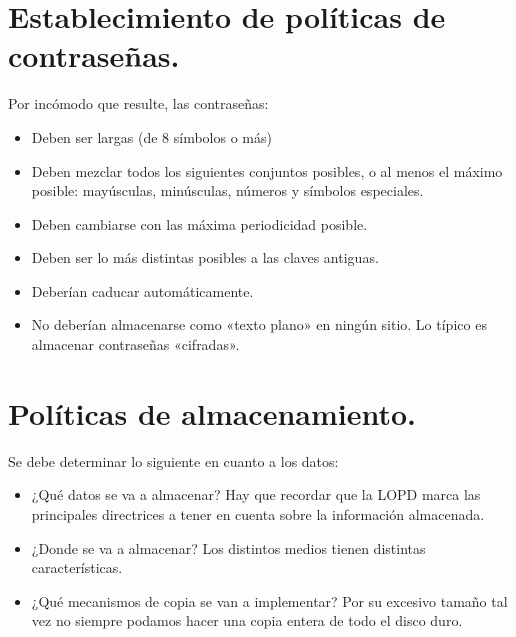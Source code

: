 \documentclass[letterpaper,10pt,spanish]{sphinxmanual}
\begin{document}
\section{Establecimiento de políticas de contraseñas.}
\label{\detokenize{tema_pautas_seguridad_informatica/tema_pautas_seguridad_informatica:establecimiento-de-politicas-de-contrasenas}}
Por incómodo que resulte, las contraseñas:
\begin{itemize}
\item {} 
Deben ser largas (de 8 símbolos o más)

\item {} 
Deben mezclar todos los siguientes conjuntos posibles, o al menos el máximo posible: mayúsculas, minúsculas, números y símbolos especiales.

\item {} 
Deben cambiarse con las máxima periodicidad posible.

\item {} 
Deben ser lo más distintas posibles a las claves antiguas.

\item {} 
Deberían caducar automáticamente.

\item {} 
No deberían almacenarse como «texto plano» en ningún sitio. Lo típico es almacenar contraseñas «cifradas».

\end{itemize}


\section{Políticas de almacenamiento.}
\label{\detokenize{tema_pautas_seguridad_informatica/tema_pautas_seguridad_informatica:politicas-de-almacenamiento}}
Se debe determinar lo siguiente en cuanto a los datos:
\begin{itemize}
\item {} 
¿Qué datos se va a almacenar? Hay que recordar que la LOPD marca las principales directrices a tener en cuenta sobre la información almacenada.

\item {} 
¿Donde se va a almacenar? Los distintos medios tienen distintas características.

\item {} 
¿Qué mecanismos de copia se van a implementar? Por su excesivo tamaño tal vez no siempre podamos hacer una copia entera de todo el disco duro.

\end{itemize}
\end{document}
